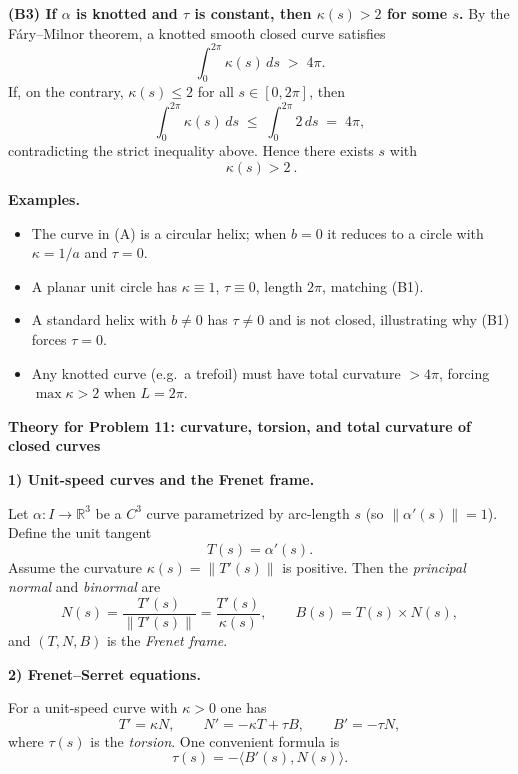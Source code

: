 \begin{solution}
	\medskip
	
	\textbf{(B3) If $\alpha$ is knotted and $\tau$ is constant, then $\kappa(s)>2$ for some $s$.}
	By the F\'ary--Milnor theorem, a knotted smooth closed curve satisfies
	\[
	\int_0^{2\pi} \kappa(s)\,ds \;>\; 4\pi.
	\]
	If, on the contrary, $\kappa(s)\le 2$ for all $s\in[0,2\pi]$, then
	\[
	\int_0^{2\pi}\kappa(s)\,ds \;\le\; \int_0^{2\pi} 2\,ds \;=\; 4\pi,
	\]
	contradicting the strict inequality above. Hence there exists $s$ with
	\[
	\boxed{\ \kappa(s)>2\ }.
	\]
	
	\par\medskip\noindent\textbf{Examples.}\par\smallskip

	\begin{itemize}
		\item The curve in (A) is a circular helix; when $b=0$ it reduces to a circle with $\kappa=1/a$ and $\tau=0$.
		\item A planar unit circle has $\kappa\equiv 1$, $\tau\equiv 0$, length $2\pi$, matching (B1).
		\item A standard helix with $b\neq 0$ has $\tau\neq 0$ and is not closed, illustrating why (B1) forces $\tau=0$.
		\item Any knotted curve (e.g.\ a trefoil) must have total curvature $>4\pi$, forcing $\max\kappa>2$ when $L=2\pi$.
	\end{itemize}
	
	\par\medskip\noindent\textbf{Theory for Problem 11: curvature, torsion, and total curvature of closed curves}\par\smallskip

	
	\par\medskip\noindent\textbf{1) Unit-speed curves and the Frenet frame.}\par\smallskip

	Let $\alpha:I\to\mathbb{R}^3$ be a $C^3$ curve parametrized by arc-length $s$ (so $\|\alpha'(s)\|=1$).
	Define the unit tangent
	\[
	T(s)=\alpha'(s).
	\]
	Assume the curvature $\kappa(s)=\|T'(s)\|$ is positive. Then the \emph{principal normal} and \emph{binormal} are
	\[
	N(s)=\frac{T'(s)}{\|T'(s)\|}=\frac{T'(s)}{\kappa(s)},
	\qquad
	B(s)=T(s)\times N(s),
	\]
	and $(T,N,B)$ is the \emph{Frenet frame}.
	
	\par\medskip\noindent\textbf{2) Frenet--Serret equations.}\par\smallskip

	For a unit-speed curve with $\kappa>0$ one has
	\[
	T'=\kappa N,\qquad
	N'=-\kappa T+\tau B,\qquad
	B'=-\tau N,
	\]
	where $\tau(s)$ is the \emph{torsion}. One convenient formula is
	\[
	\tau(s) = -\langle B'(s),N(s)\rangle.
	\]
	

\end{solution}
